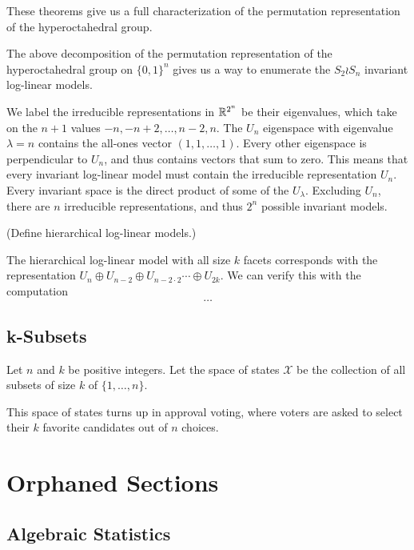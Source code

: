 \documentclass[cclicense]{hmcthesis}
\providecommand*{\xs}{\mathcal X}
\numberwithin{equation}{chapter}
\numberwithin{thmcounter}{chapter}
\begin{document}
    These theorems give us a full characterization of the permutation
    representation of the hyperoctahedral group.

    The above decomposition of the permutation representation of the
    hyperoctahedral group on $\{0, 1\}^n$ gives us a way to enumerate the $S_2
    \wr S_n$ invariant log-linear models.

    We label the irreducible representations in $\mathbb{R}^{2^n}$ be their eigenvalues,
    which take on the $n+1$ values $-n, -n + 2, \ldots, n - 2, n$.  The
    $U_n$ eigenspace with eigenvalue $\lambda = n$ contains the all-ones vector $(1,1,
    \ldots, 1)$.  Every other eigenspace is perpendicular to $U_n$, and thus
    contains vectors that sum to zero.  This means that every invariant
    log-linear model must contain the irreducible representation $U_n$.  Every
    invariant space is the direct product of some of the $U_\lambda$.  Excluding
    $U_n$, there are $n$ irreducible representations, and thus $2^n$ possible
    invariant models.

    (Define hierarchical log-linear models.)

    The hierarchical log-linear model with all size $k$ facets corresponds with
    the representation $U_n \oplus U_{n-2} \oplus U_{n-2\cdot2}\cdots \oplus U_{2k}$.
    We can verify this with the computation
    \[
        \ldots
    \]

\section{k-Subsets}

    Let $n$ and $k$ be positive integers.  Let the space of states $\xs$ be the
    collection of all subsets of size $k$ of $\{1, \ldots, n\}$.

    This space of states turns up in approval voting, where voters are asked to
    select their $k$ favorite candidates out of $n$ choices.



\appendix


\chapter{Orphaned Sections}

\section{Algebraic Statistics}
\end{document}
